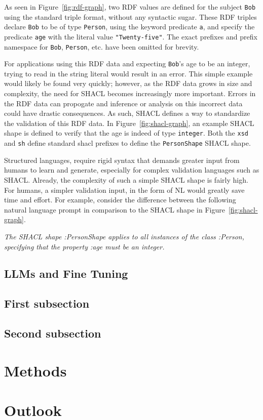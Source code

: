 \documentclass[
  english,        %
  font=times,     %
  twocolumn,      %
]{tumarticle}
\begin{document}
As seen in Figure~\ref{fig:rdf-graph}, two RDF values are defined for the subject \texttt{Bob} using the standard triple format, without any syntactic sugar.
These RDF triples declare \texttt{Bob} to be of type \texttt{Person}, using the keyword predicate \texttt{a}, and specify the predicate \texttt{age} with the literal value \texttt{"Twenty-five"}.
The exact prefixes and prefix namespace for \texttt{Bob}, \texttt{Person}, etc. have been omitted for brevity.

For applications using this RDF data and expecting \texttt{Bob}'s age to be an integer, trying to read in the string literal would result in an error. 
This simple example would likely be found very quickly; however, as the RDF data grows in size and complexity, the need for SHACL becomes increasingly more important. 
Errors in the RDF data can propogate and inference or analysis on this incorrect data could have drastic consequences.
As such, SHACL defines a way to standardize the validation of this RDF data. 
In Figure~\ref{fig:shacl-graph}, an example SHACL shape is defined to verify that the age is indeed of type \texttt{integer}.
Both the \texttt{xsd} and \texttt{sh} define standard shacl prefixes to define the \texttt{PersonShape} SHACL shape. 

Structured languages, require rigid syntax that demands greater input from humans to learn and generate, especially for complex validation languages such as SHACL. 
Already, the complexity of such a simple SHACL shape is fairly high.
For humans, a simpler validation input, in the form of NL would greatly save time and effort. 
For example, consider the difference between the following natural language prompt in comparison to the SHACL shape in Figure~\ref{fig:shacl-graph}.

\textit{The SHACL shape :PersonShape applies to all instances of the class :Person, specifying that the property :age must be an integer.}

\subsection{LLMs and Fine Tuning}


\subsection{First subsection}
\lipsum[2]
\subsection{Second subsection}
\lipsum[3]

\section{Methods}
\lipsum[4-5]

\section{Outlook}
\lipsum[6]
\end{document}
